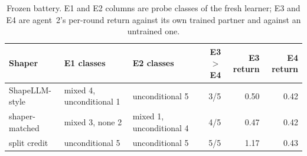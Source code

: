 \begin{table}[ht]
\centering\small
\caption{Frozen battery. E1 and E2 columns are probe classes of the fresh learner; E3 and E4 are agent~2's per-round return against its own trained partner and against an untrained one.}
\label{tab:frozen}
\begin{tabular}{lllrrr}
\toprule
Shaper & E1 classes & E2 classes & E3 $>$ E4 & E3 return & E4 return \\
\midrule
ShapeLLM-style & mixed 4, unconditional 1 & unconditional 5 & 3/5 & 0.50 & 0.42 \\
shaper-matched & mixed 3, none 2 & mixed 1, unconditional 4 & 4/5 & 0.47 & 0.42 \\
split credit & unconditional 5 & unconditional 5 & 5/5 & 1.17 & 0.43 \\
\bottomrule
\end{tabular}
\end{table}
